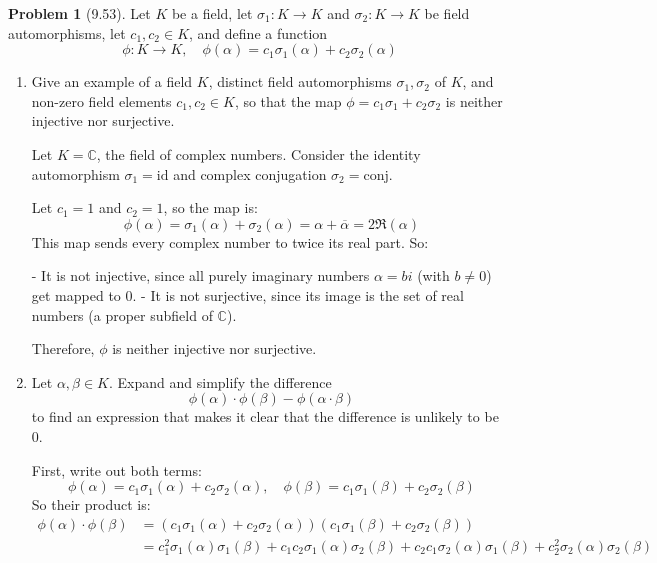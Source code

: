 \documentclass[12pt]{article}
\theoremstyle{definition}
\newtheorem{problem}{Problem}
\begin{document}
\begin{problem}[9.53]
    Let $K$ be a field, let $\sigma_1 : K \longrightarrow K$ and $\sigma_2 : K \longrightarrow K$ be field automorphisms,
    let $c_1, c_2 \in K$, and define a function
    \[
        \phi : K \longrightarrow K, \quad \phi(\alpha) = c_1\sigma_1(\alpha) + c_2\sigma_2(\alpha)
    \]
    \begin{enumerate}[label=(\alph*)]
        \item Give an example of a field $K$, distinct field automorphisms $\sigma_1, \sigma_2$ of $K$, and non-zero field
              elements $c_1, c_2 \in K$, so that the map $\phi = c_1\sigma_1 + c_2\sigma_2$ is neither injective nor surjective.
        
        \begin{solution}
            Let $K = \mathbb{C}$, the field of complex numbers. Consider the identity automorphism $\sigma_1 = \text{id}$ and complex conjugation $\sigma_2 = \text{conj}$.

            Let $c_1 = 1$ and $c_2 = 1$, so the map is:
            \[
                \phi(\alpha) = \sigma_1(\alpha) + \sigma_2(\alpha) = \alpha + \overline{\alpha} = 2\Re(\alpha)
            \]
            This map sends every complex number to twice its real part. So:

            - It is not injective, since all purely imaginary numbers $\alpha = bi$ (with $b \ne 0$) get mapped to $0$.
            - It is not surjective, since its image is the set of real numbers (a proper subfield of $\mathbb{C}$).

            Therefore, $\phi$ is neither injective nor surjective.
        \end{solution}

        \item Let $\alpha, \beta \in K$. Expand and simplify the difference
              \[
                    \phi(\alpha) \cdot \phi(\beta) - \phi(\alpha \cdot \beta)
              \]
              to find an expression that makes it clear that the difference is unlikely to be 0.
        
        \begin{solution}
            First, write out both terms:
            \[
                \phi(\alpha) = c_1\sigma_1(\alpha) + c_2\sigma_2(\alpha), \quad \phi(\beta) = c_1\sigma_1(\beta) + c_2\sigma_2(\beta)
            \]
            So their product is:
            \begin{align*}
                \phi(\alpha) \cdot \phi(\beta)
                &= (c_1\sigma_1(\alpha) + c_2\sigma_2(\alpha))(c_1\sigma_1(\beta) + c_2\sigma_2(\beta)) \\
                &= c_1^2 \sigma_1(\alpha)\sigma_1(\beta) + c_1c_2\sigma_1(\alpha)\sigma_2(\beta) + c_2c_1\sigma_2(\alpha)\sigma_1(\beta) + c_2^2 \sigma_2(\alpha)\sigma_2(\beta)
            \end{align*}


\end{solution}
\end{enumerate}
\end{problem}
\end{document}
